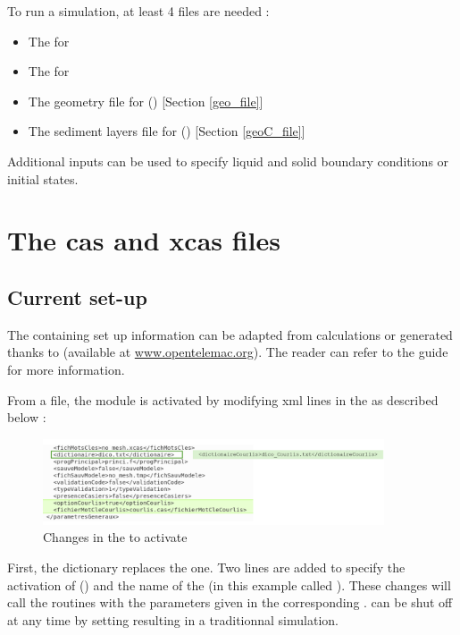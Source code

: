 To run a simulation, at least 4 files are needed :
\begin{itemize}
	\item The \cas for 
	\item The \xcas for 
	\item The geometry file for \mascaret () [Section \ref{geo_file}]
	\item The sediment layers file for \courlis () [Section \ref{geoC_file}]
\end{itemize}
Additional inputs can be used to specify liquid and solid boundary conditions or initial states. 

\section{The cas and xcas files}
\label{cas_files}
\subsection{Current set-up}
The \xcas containing \mascaret set up information can be adapted from \mascaret calculations or generated thanks to \fudaa (available at \url{www.opentelemac.org}). The reader can refer to the \mascaret guide for more information.

From a \mascaret file, the \courlis module is activated by modifying xml lines in the \xcas as described below :

\begin{figure}[htb!]
    \centering
    \includegraphics[width=0.9\textwidth]{./graphics/xcas_courlis.png}
    \caption{Changes in the \xcas to activate \courlis}
    \label{fig:xcas}
\end{figure}

First, the \courlis dictionary replaces the \mascaret one. Two lines are added to specify the activation of \courlis () and the name of the \courlis \cas (in this example called ). 
These changes will call the \courlis routines with the parameters given in the corresponding \cas. \courlis can be shut off at any time by setting  resulting in a traditionnal \mascaret simulation. 

